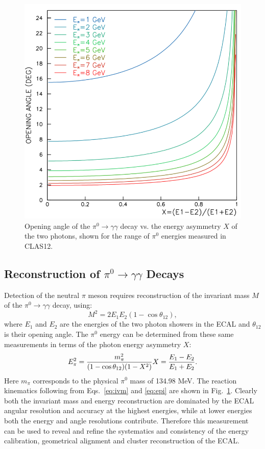 \begin{figure}[t]
\centering
\includegraphics[width=0.7\columnwidth,keepaspectratio]{img/opa.png}
\caption[]{Opening angle of the $\pi^0 \rightarrow \gamma \gamma$ decay vs. the energy asymmetry $X$ of
  the two photons, shown for the range of $\pi^0$ energies measured in CLAS12.}
\label{fig:opa}
\end{figure}

\subsection{Reconstruction of $\pi^0\rightarrow \gamma \gamma$ Decays}

Detection of the neutral $\pi$ meson requires reconstruction of the invariant mass $M$ of the
$\pi^0 \rightarrow \gamma \gamma$ decay, using:
\begin{equation}
M^2 = 2 E_1 E_2 (1-\cos \theta_{12}),
\label{eq:ivm}
\end{equation}
where $E_1$ and $E_2$ are the energies of the two photon showers in the ECAL and $\theta_{12}$ is their opening
angle. The $\pi^0$ energy can be determined from these same measurements in
terms of the photon energy asymmetry $X$:
\begin{equation}
E^2_{\pi} = \frac{m^2_{\pi}}{(1-\cos \theta_{12})(1-X^2)}  \\
X=\frac{E_1-E_2}{E_1+E_2}.
\label{eq:epi}
\end{equation}
Here $m_\pi$ corresponds to the physical $\pi^0$ mass of 134.98 MeV.
The reaction kinematics following from Eqs.~\ref{eq:ivm} and \ref{eq:epi} are shown in Fig.~\ref{fig:opa}. Clearly
both the invariant mass and energy reconstruction are dominated by the ECAL angular resolution and accuracy
at the highest energies, while at lower energies both the energy and angle resolutions contribute. Therefore this
measurement can be used to reveal and refine the systematics and consistency of the energy calibration, geometrical
alignment and cluster reconstruction of the ECAL.

